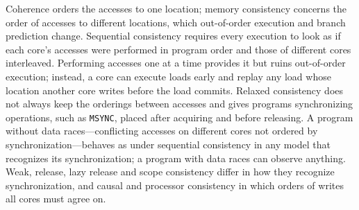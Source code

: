 \documentclass[../main.tex]{subfiles}
\begin{document}
\begin{keypoint}
  Coherence orders the accesses to one location; memory consistency concerns
  the order of accesses to different locations, which out-of-order execution
  and branch prediction change.  Sequential consistency requires every
  execution to look as if each core's accesses were performed in program
  order and those of different cores interleaved.  Performing accesses one at
  a time provides it but ruins out-of-order execution; instead, a core can
  execute loads early and replay any load whose location another core writes
  before the load commits.  Relaxed consistency does not always keep the
  orderings between accesses and gives programs synchronizing operations, such
  as \texttt{MSYNC}, placed after acquiring and before releasing.  A program
  without data races---conflicting accesses on different cores not ordered by
  synchronization---behaves as under sequential consistency in any model that
  recognizes its synchronization; a program with data races can observe
  anything.  Weak, release, lazy release and scope consistency differ in how
  they recognize synchronization, and causal and processor consistency in
  which orders of writes all cores must agree on.
\end{keypoint}
\end{document}
